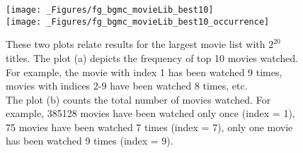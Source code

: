 \begin{figure}[h!]
\vspace*{-2ex}
\centering


\texttt{[image: \_Figures/fg\_bgmc\_movieLib\_best10]}
\\[2ex]
\texttt{[image: \_Figures/fg\_bgmc\_movieLib\_best10\_occurrence]}


\caption{
These two plots relate results for the largest movie list with $2^{20}$ titles.
The plot (a) depicts the frequency of top 10 movies watched. For example, the movie with index 1 has been watched 9 times, movies with indices 2-9 have been watched 8 times, etc. 
\\
The plot (b) counts the total number of movies watched. For example, 385128 movies have been watched only once (index = 1), 75 movies have been watched 7 times (index = 7), only one movie has been watched 9 times (index = 9).
\vspace*{-3ex}
}
\label{fg_bgmc_movieLib_best10}
\end{figure}
